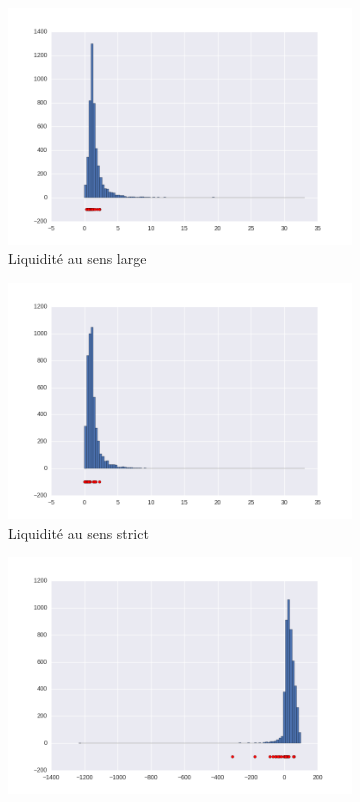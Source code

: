 \documentclass[DIV=calc, paper=a4, fontsize=11pt, twocolumn]{scrartcl}
\begin{document}
\begin{appendices}
\begin{figure}
\captionsetup[subfigure]{labelformat=empty}
  \begin{subfigure}{.45\textwidth}
    \centering
    \includegraphics[width=\linewidth]{r13.png}
    \caption{ Liquidité au sens large}
  \end{subfigure}
  \begin{subfigure}{.45\textwidth}
    \centering
    \includegraphics[width=\linewidth]{r14.png}
    \caption{Liquidité au sens strict}
  \end{subfigure}
  \begin{subfigure}{.45\textwidth}
    \centering
    \includegraphics[width=\linewidth]{r19.png}

\end{subfigure}
\end{figure}
\end{appendices}
\end{document}
